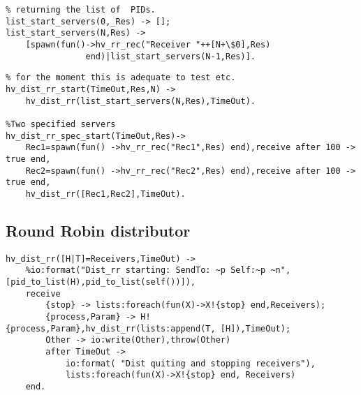 \begin{lstlisting}[name=hvp2]
%Start N round-robin receivers that will send their results to Res
% returning the list of	 PIDs.
list_start_servers(0,_Res) -> [];
list_start_servers(N,Res) -> 
	[spawn(fun()->hv_rr_rec("Receiver "++[N+\$0],Res)
				end)|list_start_servers(N-1,Res)].
\end{lstlisting}%

\begin{lstlisting}[name=hvp2]
%Number of servers variable, should make that a number to pass too, but 
% for the moment this is adequate to test etc.
hv_dist_rr_start(TimeOut,Res,N) -> 
	hv_dist_rr(list_start_servers(N,Res),TimeOut).

%Two specified servers
hv_dist_rr_spec_start(TimeOut,Res)->
	Rec1=spawn(fun() ->hv_rr_rec("Rec1",Res) end),receive after 100 -> true end,
	Rec2=spawn(fun() ->hv_rr_rec("Rec2",Res) end),receive after 100 -> true end,
	hv_dist_rr([Rec1,Rec2],TimeOut).
\end{lstlisting}

\subsection{Round Robin distributor}
\begin{lstlisting}[name=hvp2]
%Round Robin distributor.. we know this is not "optimal" :)
hv_dist_rr([H|T]=Receivers,TimeOut) ->
	%io:format("Dist_rr starting: SendTo: ~p Self:~p ~n",[pid_to_list(H),pid_to_list(self())]),
	receive
		{stop} -> lists:foreach(fun(X)->X!{stop} end,Receivers);
		{process,Param} -> H!{process,Param},hv_dist_rr(lists:append(T, [H]),TimeOut);
		Other -> io:write(Other),throw(Other)
		after TimeOut ->
			io:format( "Dist quiting and stopping receivers"),
			lists:foreach(fun(X)->X!{stop} end, Receivers)
	end.
\end{lstlisting}

